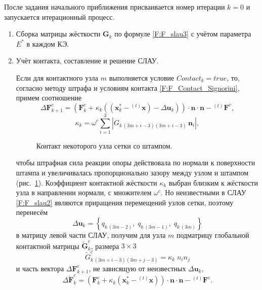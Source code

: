 После задания начального приближения присваивается номер итерации $k=0$ и запускается итерационный процесс.
\begin{enumerate}
	\item
	\label {itm:alg_start}
	Сборка матрицы жёсткости $\mathbf{G}_k$ по формуле \eqref{F:F_slau3} с учётом параметра $E^*$ в каждом КЭ.
	\item
	Учёт контакта, составление и решение СЛАУ.
	
	Если для контактного узла $m$ выполняется условие $Contact_k=true$, то, согласно методу штрафа \cite{Wriggers2006} и условиям контакта \eqref{F:F_Contact_Signorini}, примем соотношение
	\begin{equation}
	\Delta\mathbf{F}_{k+1}^{c}=\left(\mathbf{F}_k^{c}+\kappa_k\left(\left( \mathbf{x}_k^*-{}^{(t)}\mathbf{x}\right) -\Delta\mathbf{u}_k\right)\right)\cdot\mathbf{n}\cdot\mathbf{n}-{}^{(t)}\mathbf{F}^c,
	\label{F:F_algoritm_force}
	\end{equation}
	\begin{equation}
	\kappa_k=\omega^{c}\sum_{i=1}^{3}\left| G_{k\,(3m+i-3)(3m+i-3)}\, \mathbf{n}_i \right|,
	\label{F:F_algoritm_kappa}
	\end{equation}
	\begin{figure}
		\centering
		
		\caption{ Контакт некоторого узла сетки со штампом.}
		\label{fig:contact}
	\end{figure}
	чтобы штрафная сила реакции опоры действовала по нормали к поверхности штампа и увеличивалась пропорционально зазору между узлом и штампом \mbox{(рис. \ref{fig:contact})}. Коэффициент контактной жёсткости $\kappa_k$ выбран близким к жёсткости узла в направлении нормали, с множителем $\omega^{c}$. Но неизвестными в СЛАУ \eqref{F:F_slau2} являются приращения перемещений узлов сетки, поэтому перенесём
	\begin{equation}
	\Delta\mathbf{u}_k=\left\{ q_{k\,(3m-2)},\; q_{k\,(3m-1)},\; q_{k\,(3m)} \right\}
	\label{F:F_algoritm_G_delta_u}
	\end{equation}
	в матрицу левой части СЛАУ, получим для узла $m$ подматрицу глобальной контактной матрицы $\tilde{\mathbf{G}}_k^c$, размера $3\times3$
	\begin{equation}
	\tilde{G}_{k\,(3m+i-3)(3m+j-3)}^{c}={}\kappa_{k}\;n_{i}n_{j}
	\label{F:F_algoritm_G1}
	\end{equation}
	и часть вектора $\Delta\mathbf{F}_{k+1}^{c}$, не зависящую от неизвестных $\Delta\mathbf{u}_k$,
	\begin{equation}
	\Delta\tilde{\mathbf{F}}_k^c=\left(\mathbf{F}_k^c+\kappa_k\left(\mathbf{x}_k^*-{}^{(t)}\mathbf{x}\right)\right)\cdot\mathbf{n}\cdot\mathbf{n}-{}^{(t)}\mathbf{F}^c.
	\label{F:F_algoritm_b1}
	\end{equation}
	

\end{enumerate}
